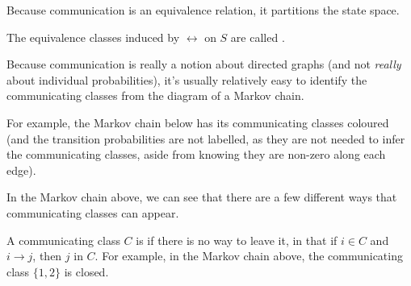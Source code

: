\documentclass[a4paper]{scrartcl}
\begin{document}
Because communication is an equivalence relation, it partitions the state space.

\begin{definition}
	The equivalence classes induced by $\longleftrightarrow$ on $S$ are called .
\end{definition}

Because communication is really a notion about directed graphs (and not \emph{really} about individual probabilities), it's usually relatively easy to identify the communicating classes from the diagram of a Markov chain.

For example, the Markov chain below has its communicating classes coloured (and the transition probabilities are not labelled, as they are not needed to infer the communicating classes, aside from knowing they are non-zero along each edge).

\begin{center}
\end{center}

In the Markov chain above, we can see that there are a few different ways that communicating classes can appear.

A communicating class $C$ is  if there is no way to leave it, in that if $i \in C$ and $i \rightarrow j$, then $j$ in $C$. For example, in the Markov chain above, the communicating class $\{1, 2\}$ is closed.
\end{document}
